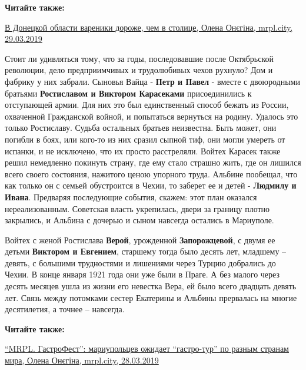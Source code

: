 \textbf{Читайте также:} 

\href{https://mrpl.city/news/view/v-donetskoj-oblasti-vareniki-dorozhe-chem-v-stolitse}{%
В Донецкой области вареники дороже, чем в столице, Олена Онєгіна, mrpl.city, 29.03.2019}

Стоит ли удивляться тому, что за годы, последовавшие после Октябрьской
революции, дело предприимчивых и трудолюбивых чехов рухнуло? Дом и фабрику у
них забрали. Сыновья Вайца - \textbf{Петр и Павел} - вместе с двоюродными братьями
\textbf{Ростиславом и Виктором Карасеками} присоединились к отступающей армии. Для них
это был единственный способ бежать из России, охваченной Гражданской войной, и
попытаться вернуться на родину. Удалось это только Ростиславу. Судьба остальных
братьев неизвестна. Быть может, они погибли в боях, или кого-то из них сразил
сыпной тиф, они могли умереть от испанки, и не исключено, что их просто
расстреляли. Войтех Карасек также решил немедленно покинуть страну, где ему
стало страшно жить, где он лишился всего своего состояния, нажитого ценою
упорного труда. Альбине пообещал, что как только он с семьей обустроится в
Чехии, то заберет ее и детей - \textbf{Людмилу и Ивана}. Предваряя последующие события,
скажем: этот план оказался нереализованным. Советская власть укрепилась, двери
за границу плотно закрылись, и Альбина с дочерью и сыном навсегда остались в
Мариуполе.

Войтех с женой Ростислава \textbf{Верой}, урожденной \textbf{Запорожцевой}, с двумя ее детьми
\textbf{Виктором и Евгением}, старшему тогда было десять лет, младшему – девять, с
большими трудностями и лишениями через Турцию добрались до Чехии. В конце
января 1921 года они уже были в Праге. А без малого через десять месяцев ушла
из жизни его невестка Вера, ей было всего двадцать девять лет. Связь между
потомками сестер Екатерины и Альбины прервалась на многие десятилетия, а точнее
– навсегда.

\textbf{Читайте также:} 

\href{https://mrpl.city/news/view/mrpl-gastrofest-mariupoletsev-ozhidaet-gastro-tur-po-raznym-stranam-mira-foto}{%
\enquote{MRPL. ГастроФест}: мариупольцев ожидает \enquote{гастро-тур} по разным странам мира, Олена Онєгіна, mrpl.city, 28.03.2019}

